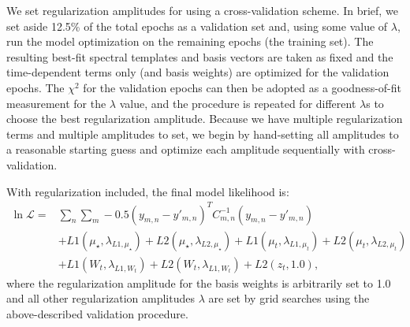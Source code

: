 \documentclass[modern]{aastex62}
\begin{document}
We set regularization amplitudes for \wobble using a cross-validation scheme.
In brief, we set aside 12.5\% of the total epochs as a validation set and, using some value of $\lambda$, run the model optimization on the remaining epochs (the training set).
The resulting best-fit spectral templates and basis vectors are taken as fixed and the time-dependent terms only (\RVs and basis weights) are optimized for the validation epochs.
The $\chi^2$ for the validation epochs can then be adopted as a goodness-of-fit measurement for the $\lambda$ value, and the procedure is repeated for different $\lambda$s to choose the best regularization amplitude.
Because we have multiple regularization terms and multiple amplitudes to set, we begin by hand-setting all amplitudes to a reasonable starting guess and optimize each amplitude sequentially with cross-validation.

With regularization included, the final model likelihood is:
\begin{equation}
\begin{split}
\ln \mathcal{L} = & \sum_{n} \sum_{m} -0.5 (y_{m,n} - y'_{m,n})^T C_{m,n}^{-1} (y_{m,n}-y'_{m,n})  \\
 & + L1(\mu_{\star}, \lambda_{L1, \mu_{\star}}) + L2(\mu_{\star}, \lambda_{L2, \mu_{\star}}) + L1(\mu_{t},  \lambda_{L1, \mu_{t}}) + L2(\mu_{t},  \lambda_{L2, \mu_{t}}) \\
 & + L1(W_t, \lambda_{L1, W_t}) + L2(W_t, \lambda_{L1, W_t}) + L2(z_t, 1.0) ,
\end{split}
\end{equation}
where the regularization amplitude for the basis weights is arbitrarily set to 1.0 and all other regularization amplitudes $\lambda$ are set by grid searches using the above-described validation procedure. 

\end{document}
